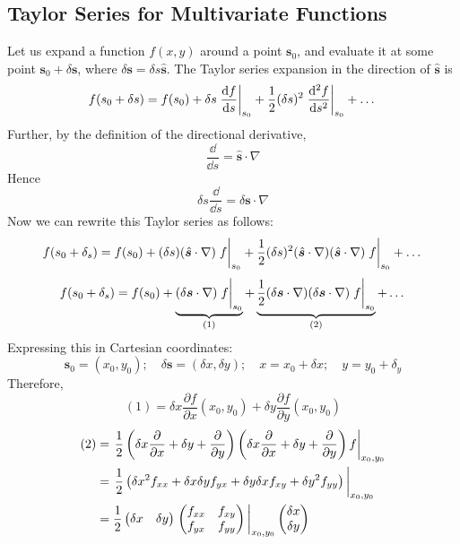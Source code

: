 \documentclass{article}
\begin{document}
\subsection{Taylor Series for Multivariate Functions}
Let us expand a function $f(x, y)$ around a point $\bm s_0$, and evaluate it at some point $\bm s_0 + \delta \bm s$, where $\delta \bm s = \delta s \hat{\bm s}$. The Taylor series expansion in the direction of $\hat{\bm s}$ is
\[ f(s_0 + \delta s) = f(s_0) + \delta s \eval{\frac{\dd f}{\dd s} }_{s_0} + \frac{1}{2} (\delta s)^2\eval{\frac{\dd^2 f}{\dd s^2}}_{s_0} + \dots \]
Further, by the definition of the directional derivative,
\[ \frac{\dd}{\dd s} = \hat{\bm s}\cdot \nabla \]
Hence
\[ \delta s \frac{\dd}{\dd s} = \delta \bm s \cdot \nabla \]
Now we can rewrite this Taylor series as follows:
\[ f(s_0 + \delta_s) = f(s_0) + (\delta s)(\hat{\bm s} \cdot \nabla) \eval{f}_{s_0} + \frac{1}{2}(\delta s)^2(\hat{\bm s} \cdot \nabla)(\hat{\bm s} \cdot \nabla)\eval{f}_{s_0} + \dots \]
\[ f(s_0 + \delta_s) = f(s_0) + \underbrace{(\delta \bm s \cdot \nabla) \eval{f}_{s_0}}_{(1)} + \underbrace{\frac{1}{2}(\delta \bm s \cdot \nabla)(\delta \bm s \cdot \nabla)\eval{f}_{s_0}}_{(2)} + \dots \]
Expressing this in Cartesian coordinates:
\[ \bm s_0 = (x_0, y_0);\quad \delta \bm s = (\delta x, \delta y);\quad x=x_0+\delta x;\quad y=y_0+\delta_y \]
Therefore,
\[ (1) = \delta x \frac{\partial f}{\partial x}(x_0, y_0) + \delta y \frac{\partial f}{\partial y}(x_0, y_0) \]
\begin{align*}
	(2) & = \eval{\frac{1}{2}\left( \delta x \frac{\partial}{\partial x} + \delta y + \frac{\partial}{\partial y} \right)\left( \delta x \frac{\partial}{\partial x} + \delta y + \frac{\partial}{\partial y} \right)f}_{x_0, y_0} \\
	    & = \eval{\frac{1}{2}\left( \delta x^2 f_{xx} + \delta x \delta y f_{yx} + \delta y \delta x f_{xy} + \delta y^2 f_{yy} \right)}_{x_0, y_0}                                                                                \\
	    & = \frac{1}{2}\begin{pmatrix}
		\delta x & \delta y
	\end{pmatrix} \eval{\begin{pmatrix}
			f_{xx} & f_{xy} \\
			f_{yx} & f_{yy}
		\end{pmatrix}}_{x_0, y_0} \begin{pmatrix}
		\delta x \\ \delta y
	\end{pmatrix}
\end{align*}
\end{document}
